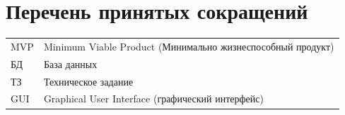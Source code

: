 \documentclass[a4paper,14pt]{extarticle}
\begin{document}
\section{Перечень принятых сокращений}

\begin{tabular}{p{4cm}p{10cm}}
MVP & Minimum Viable Product (Минимально жизнеспособный продукт) \\
БД & База данных \\
ТЗ & Техническое задание \\
GUI & Graphical User Interface (графический интерфейс) \\
\end{tabular}
\end{document}
